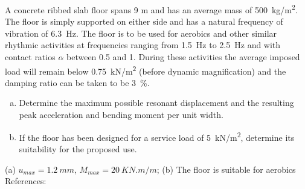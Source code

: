 
\begin{Exercise}[label={footfall_analysis}]
A concrete ribbed slab floor spans 9 m and has an average mass of \qty{500}{kg/m^2}. The floor is simply supported on either side and has a natural frequency of vibration of \qty{6.3}{Hz}. The floor is to be used for aerobics and other similar rhythmic activities at frequencies ranging from \qty{1.5}{Hz} to \qty{2.5}{Hz} and with contact ratios $\alpha$ between 0.5 and 1. During these activities the average imposed load will remain below \qty{0.75}{kN/m^2} (before dynamic magnification) and the damping ratio can be taken to be \qty{3}{\%}.

\begin{enumerate}[(a)]
    \item Determine the maximum possible resonant displacement and the resulting peak acceleration and bending moment per unit width.
    \item If the floor has been designed for a service load of \qty{5}{kN/m^2}, determine its suitability for the proposed use.
\end{enumerate}

\begin{center}
\hspace{1em}
\end{center}

\shortAnswer (a) $u_{max} = \SI{1.2}{mm}$, $M_{max} = \SI{20}{KN.m/m}$; (b) The floor is suitable for aerobics\\
References: \cite[page ??]{chopra}
\end{Exercise}



